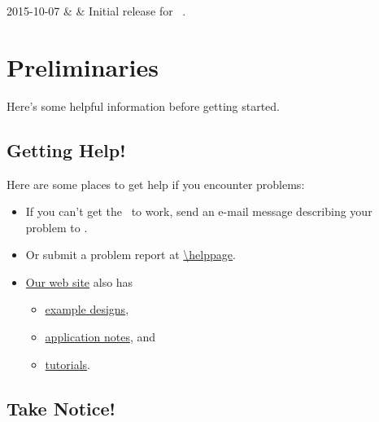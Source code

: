 \documentclass[letterpaper,11pt,oneside]{memoir}
\newcommand{\copyrightyear}{2015}
\begin{document}
\frontmatter


\makexesslegal{\copyrightyear}

\begin{xessrevisiontbl}
	2015-10-07 & \manualversion & Initial release for \product\ \manualversion.\\
	\hline
\end{xessrevisiontbl}

\makexesstoc

\mainmatter

\chapter{Preliminaries}

Here's some helpful information before getting started.


\section{Getting Help!}

Here are some places to get help if you encounter problems:

\begin{itemize}
\item If you can't get the \product\ to work, send an e-mail message
	describing your problem to \href{mailto:\helpemail}{\helpemail}. 
\item Or submit a problem report at	\url{\helppage}.
\item \href{http://www.xess.com}{Our web site} also has
	\begin{itemize}
	\item \href{http://www.xess.com/projects/}{example designs}, 
	\item \href{http://www.xess.com/appnotes/}{application notes}, and
	\item \href{http://www.xess.com/tutorials/}{tutorials}.
	\end{itemize}
\end{itemize}


\section{Take Notice!}
\end{document}
